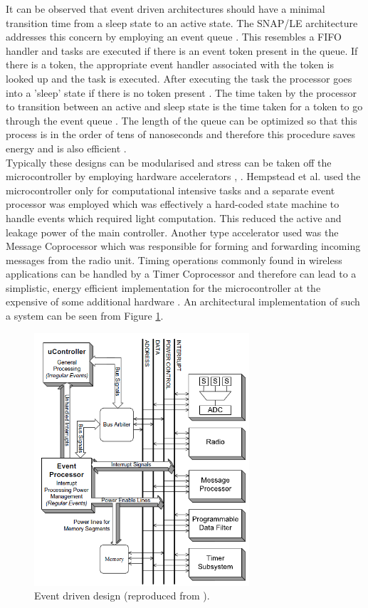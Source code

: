 \documentclass[journal]{IEEEtran}
\begin{document}
It can be observed that event driven architectures should have a minimal transition time from a sleep state to an active state. The SNAP/LE architecture addresses this concern by employing an event queue \cite{SNAP/LE}. This resembles a FIFO handler and tasks are executed if there is an event token present in the queue. If there is a token, the appropriate event handler associated with the token is looked up and the task is executed. After executing the task the processor goes into a 'sleep' state if there is no token present \cite{SNAP/LE}. The time taken by the processor to transition between an active and sleep state is the time taken for a token to go through the event queue \cite{SNAP/LE}. The length of the queue can be optimized so that this process is in the order of tens of nanoseconds and therefore this procedure saves energy and is also efficient \cite{SNAP/LE}. \\

Typically these designs can be modularised and stress can be taken off the microcontroller by employing hardware accelerators \cite{SNAP/LE}, \cite{LowPower2005}. Hempstead et al. \cite{LowPower2005} used the microcontroller only for computational intensive tasks and a separate event processor was employed which was effectively a hard-coded state machine to handle events which required light computation. This reduced the active and leakage power of the main controller. Another type accelerator used was the Message Coprocessor which was responsible for forming and forwarding incoming messages from the radio unit. Timing operations commonly found in wireless applications can be handled by a Timer Coprocessor and therefore can lead to a simplistic, energy efficient implementation for the microcontroller at the expensive of some additional hardware \cite{LowPower2005}. An architectural implementation of such a system can be seen from Figure \ref{Figure:Async}. \\
	
	\begin{figure}[h]
	   \centering
	   \includegraphics[width = 8cm]{Async}
	   \caption{Event driven design (reproduced from \cite{LowPower2005}).}
	   \label{Figure:Async}
	\end{figure}	
	\FloatBarrier
	
\end{document}
